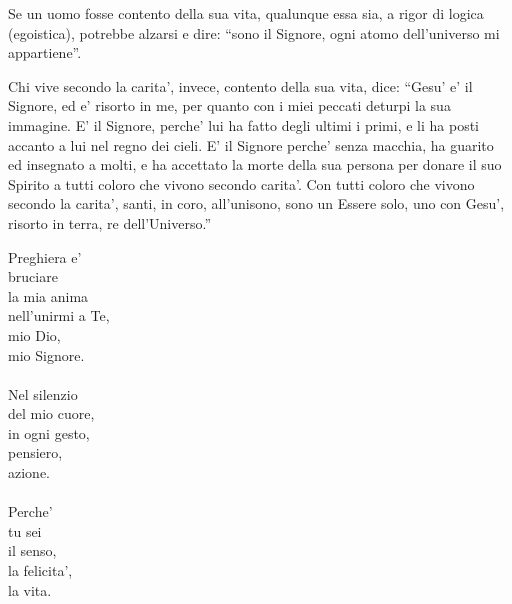 

%
\begin{vcentered}
    Se un uomo fosse contento della sua vita, qualunque essa sia, a rigor di logica (egoistica), potrebbe alzarsi e dire: ``sono il Signore, ogni atomo dell'universo mi appartiene''. 

    Chi vive secondo la carita', invece, contento della sua vita, dice: ``Gesu' e' il Signore, ed e' risorto in me, per quanto con i miei peccati deturpi la sua immagine. E' il Signore, perche' lui ha fatto degli ultimi i primi, e li ha posti accanto a lui nel regno dei cieli. E' il Signore perche' senza macchia, ha guarito ed insegnato a molti, e ha accettato la morte della sua persona per donare il suo Spirito a tutti coloro che vivono secondo carita'.
    Con tutti coloro che vivono secondo la carita', santi, in coro, all'unisono, sono un Essere solo, uno con Gesu', risorto in terra, re dell'Universo.''
\end{vcentered}


\begin{haiku}
Preghiera e'\\
bruciare\\
la mia anima\\
nell'unirmi a Te,\\
mio Dio,\\
mio Signore.\\
\leavevmode\\
Nel silenzio\\
del mio cuore,\\
in ogni gesto,\\
pensiero,\\
azione.\\
\leavevmode\\
Perche'\\
tu sei\\
il senso,\\
la felicita',\\
la vita.\\
\end{haiku}


